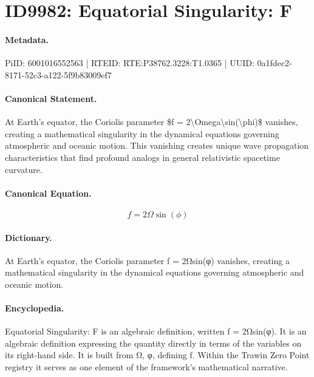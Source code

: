 \section*{ID9982: Equatorial Singularity: F}
\paragraph{Metadata.}
PiID: 6001016552563 | RTEID: RTE:P38762.3228:T1.0365 | UUID: 0a1fdec2-8171-52c3-a122-5f9b83009ef7

\paragraph{Canonical Statement.}
At Earth's equator, the Coriolis parameter \$f = 2\textbackslash{}Omega\textbackslash{}sin(\textbackslash{}phi)\$ vanishes, creating a mathematical singularity in the dynamical equations governing atmospheric and oceanic motion. This vanishing creates unique wave propagation characteristics that find profound analogs in general relativistic spacetime curvature.

\paragraph{Canonical Equation.}
\[
f = 2\Omega\sin(\phi)
\]

\paragraph{Dictionary.}
At Earth's equator, the Coriolis parameter f = 2Ωsin(φ) vanishes, creating a mathematical singularity in the dynamical equations governing atmospheric and oceanic motion.

\paragraph{Encyclopedia.}
Equatorial Singularity: F is an algebraic definition, written f = 2Ωsin(φ). It is an algebraic definition expressing the quantity directly in terms of the variables on its right-hand side. It is built from Ω, φ, defining f. Within the Trawin Zero Point registry it serves as one element of the framework's mathematical narrative.
